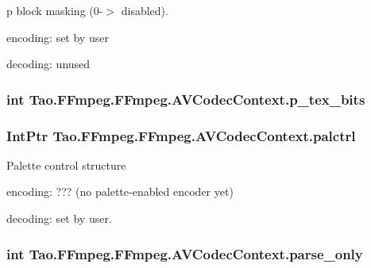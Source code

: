 \label{struct_tao_1_1_f_fmpeg_1_1_f_fmpeg_1_1_a_v_codec_context_aef8a2bdbe812842fb2035c13ce41ed21}
p block masking (0-\/$>$ disabled).
\begin{DoxyItemize}
\item encoding: set by user
\item decoding: unused 
\end{DoxyItemize}\hypertarget{struct_tao_1_1_f_fmpeg_1_1_f_fmpeg_1_1_a_v_codec_context_a9e4669d6ec0f1781cfb84036d057b80c}{
\subsubsection[{p\_\-tex\_\-bits}]{\setlength{\rightskip}{0pt plus 5cm}int {\bf Tao.FFmpeg.FFmpeg.AVCodecContext.p\_\-tex\_\-bits}}}
\label{struct_tao_1_1_f_fmpeg_1_1_f_fmpeg_1_1_a_v_codec_context_a9e4669d6ec0f1781cfb84036d057b80c}
\hypertarget{struct_tao_1_1_f_fmpeg_1_1_f_fmpeg_1_1_a_v_codec_context_a0c92960b63ac03992480b78b1baeae46}{
\subsubsection[{palctrl}]{\setlength{\rightskip}{0pt plus 5cm}IntPtr {\bf Tao.FFmpeg.FFmpeg.AVCodecContext.palctrl}}}
\label{struct_tao_1_1_f_fmpeg_1_1_f_fmpeg_1_1_a_v_codec_context_a0c92960b63ac03992480b78b1baeae46}
Palette control structure
\begin{DoxyItemize}
\item encoding: ??? (no palette-\/enabled encoder yet)
\item decoding: set by user. 
\end{DoxyItemize}\hypertarget{struct_tao_1_1_f_fmpeg_1_1_f_fmpeg_1_1_a_v_codec_context_abcb480adf398e4ecec0336c4d9328eb3}{
\subsubsection[{parse\_\-only}]{\setlength{\rightskip}{0pt plus 5cm}int {\bf Tao.FFmpeg.FFmpeg.AVCodecContext.parse\_\-only}}}

